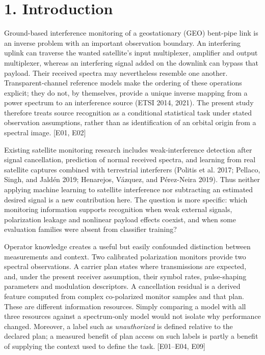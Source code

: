 \documentclass[
  10pt,
]{article}
\begin{document}
\section{1. Introduction}\label{introduction}

Ground-based interference monitoring of a geostationary (GEO) bent-pipe
link is an inverse problem with an important observation boundary. An
interfering uplink can traverse the wanted satellite's input
multiplexer, amplifier and output multiplexer, whereas an interfering
signal added on the downlink can bypass that payload. Their received
spectra may nevertheless resemble one another. Transparent-channel
reference models make the ordering of these operations explicit; they do
not, by themselves, provide a unique inverse mapping from a power
spectrum to an interference source (ETSI 2014, 2021). The present study
therefore treats source recognition as a conditional statistical task
under stated observation assumptions, rather than as identification of
an orbital origin from a spectral image. {[}E01, E02{]}

Existing satellite monitoring research includes weak-interference
detection after signal cancellation, prediction of normal received
spectra, and learning from real satellite captures combined with
terrestrial interferers (Politis et al. 2017; Pellaco, Singh, and Jaldén
2019; Henarejos, Vázquez, and Pérez-Neira 2019). Thus neither applying
machine learning to satellite interference nor subtracting an estimated
desired signal is a new contribution here. The question is more
specific: which monitoring information supports recognition when weak
external signals, polarization leakage and nonlinear payload effects
coexist, and when some evaluation families were absent from classifier
training?

Operator knowledge creates a useful but easily confounded distinction
between measurements and context. Two calibrated polarization monitors
provide two spectral observations. A carrier plan states where
transmissions are expected, and, under the present receiver assumption,
their symbol rates, pulse-shaping parameters and modulation descriptors.
A cancellation residual is a derived feature computed from complex
co-polarized monitor samples and that plan. These are different
information resources. Simply comparing a model with all three resources
against a spectrum-only model would not isolate why performance changed.
Moreover, a label such as \emph{unauthorized} is defined relative to the
declared plan; a measured benefit of plan access on such labels is
partly a benefit of supplying the context used to define the task.
{[}E01--E04, E09{]}
\end{document}
